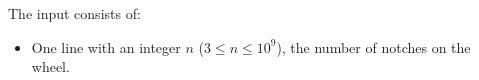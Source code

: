 
The input consists of:
\begin{itemize}
    \item One line with an integer $n$ ($3\leq n\leq 10^9$), the number of notches on the wheel.
\end{itemize}
